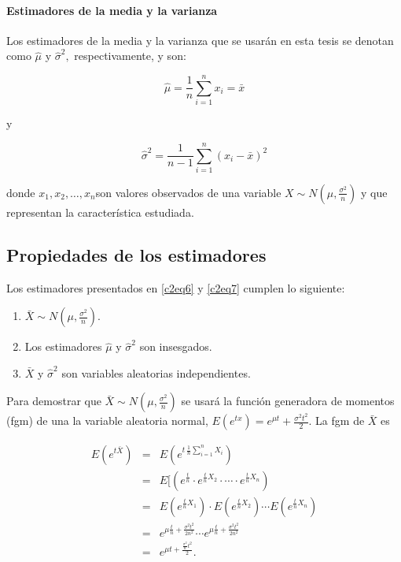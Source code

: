 \documentclass[english]{report}
\begin{document}
\paragraph{Estimadores de la media y la varianza}

Los estimadores de la media y la varianza que se usarán en esta tesis
se denotan como $\hat{\mu}$ y $\hat{\sigma}^{2},$ respectivamente,
y son:

\begin{equation}
\hat{\mu}=\frac{1}{n}\sum_{i=1}^{n}x_{i}=\bar{x} 
\label{c2eq6}
\end{equation}


y

\begin{equation}
\hat{\sigma}^{2}=\frac{1}{n-1}\sum_{i=1}^{n}(x_{i}-\bar{x})^{2}
\label{c2eq7}
\end{equation}


donde $x_{1},x_{2},\dots,x_{n}$son valores observados de una variable
$X\sim N(\mu,\frac{\sigma^{2}}{n})$ y que representan la característica
estudiada.


\subsection{Propiedades de los estimadores}

Los estimadores presentados en \ref{c2eq6} y \ref{c2eq7} cumplen
lo siguiente:

\begin{enumerate}
\item $\bar{X}\sim N(\mu,\frac{\sigma^{2}}{n}).$
\item Los estimadores $\hat{\mu}$ y $\hat{\sigma}^{2}$ son insesgados.
\item $\bar{X}$ y $\hat{\sigma}^{2}$ son variables aleatorias independientes.
\end{enumerate}

Para demostrar que $\bar{X}\sim N(\mu,\frac{\sigma^{2}}{n})$ se usará
la función generadora de momentos (fgm) de una la variable aleatoria
normal, $E(e^{tx})=e^{\mu t}+\frac{\sigma^{2}t^{2}}{2}$. La fgm de
$\bar{X}$ es

\begin{eqnarray*}
E(e^{t\bar{X}}) & = & E(e^{t\,\frac{1}{n}\sum_{i=1}^{n}X_{i}})\\
 & = & E[(e^{\frac{t}n}\cdot e^{\frac{t}{n}X_{2}}\cdot\cdots\cdot e^{\frac{t}{n}X_{n}})\\
 & = & E(e^{\frac{t}{n}X_{1}})\cdot E(e^{\frac{t}{n}X_{2}})\cdots E(e^{\frac{t}{n}X_{n}})\\
 & = & e^{\mu\frac{t}{n}+\frac{\sigma^{2}t^{2}}{2n^{2}}}\cdots e^{\mu\frac{t}{n}+\frac{\sigma^{2}t^{2}}{2n^{2}}}\\
 & = & e^{\mu t+\frac{\frac{\sigma^{2}}{n}t^{2}}{2}}.
\end{eqnarray*}
\end{document}
